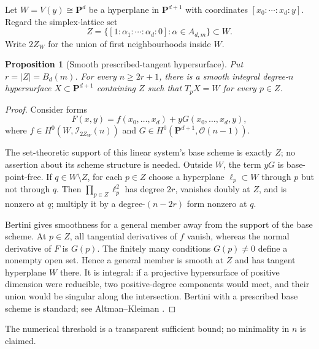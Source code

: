 \documentclass[11pt]{article}
\newtheorem{proposition}[theorem]{Proposition}
\newcommand{\PP}{\mathbf P}
\newcommand{\cI}{\mathcal I}
\newcommand{\cO}{\mathcal O}
\newcommand{\BZ}{B_d(m)}
\begin{document}
Let $W=V(y)\cong\PP^d$ be a hyperplane in $\PP^{d+1}$ with coordinates
$[x_0:\cdots:x_d:y]$.  Regard the simplex-lattice set
\[
 Z=\{[1:\alpha_1:\cdots:\alpha_d:0]:\alpha\in A_{d,m}\}\subset W.
\]
Write $2Z_W$ for the union of first neighbourhoods inside $W$.

\begin{proposition}[Smooth prescribed-tangent hypersurface]
\label{prop:bertini}
Put $r=|Z|=\BZ$.  For every $n\geq2r+1$, there is a smooth integral
degree-$n$ hypersurface $X\subset\PP^{d+1}$ containing $Z$ such that
$T_pX=W$ for every $p\in Z$.
\end{proposition}

\begin{proof}
Consider forms
\begin{equation}\label{eq:F-family}
 F(x,y)=f(x_0,\ldots,x_d)+yG(x_0,\ldots,x_d,y),
\end{equation}
where $f\in H^0(W,\cI_{2Z_W}(n))$ and
$G\in H^0(\PP^{d+1},\cO(n-1))$.

The set-theoretic support of this linear system's base scheme is exactly
$Z$; no assertion about its scheme structure is needed.  Outside $W$, the
term $yG$ is base-point-free.  If $q\in W\setminus Z$, for each $p\in Z$ choose a
hyperplane $\ell_p\subset W$ through $p$ but not through $q$.  Then
$\prod_{p\in Z}\ell_p^2$ has degree $2r$, vanishes doubly at $Z$, and is
nonzero at $q$; multiply it by a degree-$(n-2r)$ form nonzero at $q$.

Bertini gives smoothness for a general member away from the support of the
base scheme.  At
$p\in Z$, all tangential derivatives of $f$ vanish, whereas the normal
derivative of $F$ is $G(p)$.  The finitely many conditions $G(p)\neq0$ define
a nonempty open set.  Hence a general member is smooth at $Z$ and has tangent
hyperplane $W$ there.  It is integral: if a projective hypersurface of
positive dimension were reducible, two positive-degree components would
meet, and their union would be singular along the intersection.  Bertini
with a prescribed base scheme is
standard; see Altman--Kleiman \cite{AltmanKleiman1979}.
\end{proof}

The numerical threshold is a transparent sufficient bound; no minimality in
$n$ is claimed.
\end{document}
